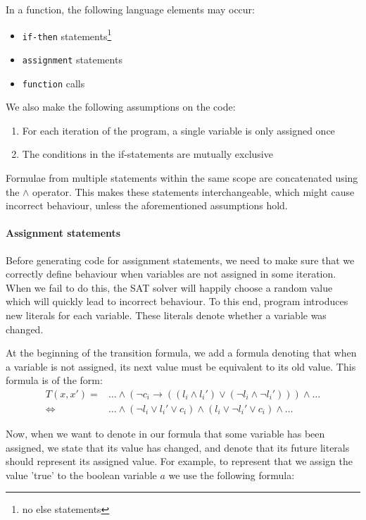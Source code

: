 \documentclass[a4paper]{article}
\begin{document}
\newpage
In a function, the following language elements may occur:
\begin{itemize}
\item \texttt{if-then} statements\footnote{no else statements}
\item \texttt{assignment} statements
\item \texttt{function} calls
\end{itemize}

We also make the following assumptions on the code:
\begin{enumerate}
\item For each iteration of the program, a single variable is only assigned once
\item The conditions in the if-statements are mutually exclusive
\end{enumerate}

Formulae from multiple statements within the same scope are concatenated using the $\land$ operator. This makes these statements interchangeable, which might cause incorrect behaviour, unless the aforementioned assumptions hold.

\paragraph{Assignment statements}
Before generating code for assignment statements, we need to make sure that we correctly define behaviour when variables are not assigned in some iteration. When we fail to do this, the SAT solver will happily choose a random value which will quickly lead to incorrect behaviour. To this end, program introduces new literals for each variable. These literals denote whether a variable was changed.

At the beginning of the transition formula, we add a formula denoting that when a variable is not assigned, its next value must be equivalent to its old value. This formula is of the form:
\begin{align*}
T(x,x') =& \ldots \land (\lnot c_i \rightarrow ((l_i \land l_i') \lor (\lnot l_i \land \lnot l_i'))) \land \ldots\\
\Leftrightarrow& \ldots \land (\lnot l_i \lor l_i' \lor c_i) \land (l_i \lor \lnot l_i' \lor c_i) \land \ldots
\end{align*}

Now, when we want to denote in our formula that some variable has been assigned, we state that its value has changed, and denote that its future literals should represent its assigned value. For example, to represent that we assign the value 'true' to the boolean variable $a$ we use the following formula:
\end{document}
